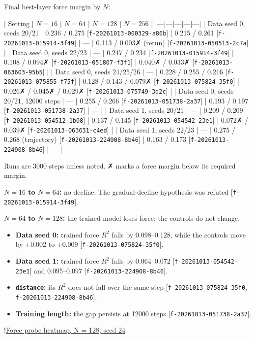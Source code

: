\documentclass{article}
\begin{document}
Final best-layer force margin by $N$:

| Setting | $N = 16$ | $N = 64$ | $N = 128$ | $N = 256$ |
|---|---|---|---|---|
| Data seed 0, seeds 20/21 | 0.236 / 0.275 [\texttt{f-20261013-000329-a86b}] | 0.215 / 0.261 [\texttt{f-20261013-015914-3f49}] | — | 0.113 / 0.003✗ (rerun) [\texttt{f-20261013-050513-2c7a}] |
| Data seed 0, seeds 22/23 | — | 0.247 / 0.234 [\texttt{f-20261013-015914-3f49}] | 0.108 / 0.094✗ [\texttt{f-20261013-051807-f3f1}] | 0.040✗ / 0.033✗ [\texttt{f-20261013-063603-95b5}] |
| Data seed 0, seeds 24/25/26 | — | 0.228 / 0.255 / 0.216 [\texttt{f-20261013-075855-f75f}] | 0.128 / 0.143 / 0.079✗ [\texttt{f-20261013-075824-35f0}] | 0.026✗ / 0.045✗ / 0.029✗ [\texttt{f-20261013-075749-3d2c}] |
| Data seed 0, seeds 20/21, 12000 steps | — | 0.255 / 0.266 [\texttt{f-20261013-051738-2a37}] | 0.193 / 0.197 [\texttt{f-20261013-051738-2a37}] | — |
| Data seed 1, seeds 20/21 | — | 0.209 / 0.209 [\texttt{f-20261013-054512-1b08}] | 0.137 / 0.145 [\texttt{f-20261013-054542-23e1}] | 0.072✗ / 0.039✗ [\texttt{f-20261013-063631-c4ed}] |
| Data seed 1, seeds 22/23 | — | 0.275 / 0.268 (trajectory) [\texttt{f-20261013-224908-8b46}] | 0.163 / 0.173 [\texttt{f-20261013-224908-8b46}] | — |

Runs are 3000 steps unless noted. ✗ marks a force margin below its required margin.

\textbf{$N = 16$ to $N = 64$:} no decline. The gradual-decline hypothesis was refuted [\texttt{f-20261013-015914-3f49}].

\textbf{$N = 64$ to $N = 128$:} the trained model loses force; the controls do not change.

\begin{itemize}
\item \textbf{Data seed 0:} trained force $R^2$ falls by 0.098–0.128, while the controls move by +0.002 to +0.009 [\texttt{f-20261013-075824-35f0}].
\item \textbf{Data seed 1:} trained force $R^2$ falls by 0.064–0.072 [\texttt{f-20261013-054542-23e1}] and 0.095–0.097 [\texttt{f-20261013-224908-8b46}].
\item \textbf{\texttt{distance}:} its $R^2$ does not fall over the same step [\texttt{f-20261013-075824-35f0}, \texttt{f-20261013-224908-8b46}].
\item \textbf{Training length:} the gap persists at 12000 steps [\texttt{f-20261013-051738-2a37}].
\end{itemize}

!\href{figure:heatmap/run-20261013-073201-7611/force}{Force probe heatmap, N = 128, seed 24}
\end{document}
